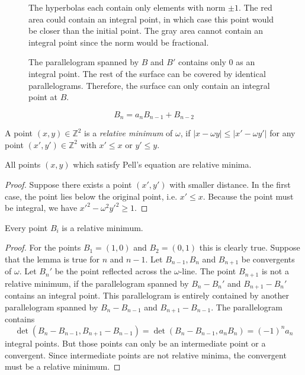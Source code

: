\begin{figure}[b]
  \centering
  
  \caption{
    The hyperbolas each contain only elements with norm $±1$.
    The red area could contain an integral point, in which case this point
    would be closer than the initial point.
    The gray area cannot contain an integral point since the norm would be fractional.}
\end{figure}

\begin{figure}[b]
  \centering
  
  \caption{
    The parallelogram spanned by $B$ and $B'$ contains only $0$ as an integral point.
    The rest of the surface can be covered by identical parallelograms.
    Therefore, the surface can only contain an integral point at $B$.
  }
\end{figure}

\[
  B_n = a_n B_{n-1} + B_{n-2}
\]

\begin{definition}
  A point $(x, y) ∈ ℤ^2$ is a \emph{relative minimum} of $ω$,
  if $|x - ω y| ≤ |x' - ω y'|$ for any point $(x', y') ∈ ℤ^2$ with $x' ≤ x$ or $y' ≤ y$.
\end{definition}

\begin{theorem}
  All points $(x, y)$ which satisfy Pell's equation are relative minima.
\end{theorem}

\begin{proof}
  Suppose there exists a point $(x', y')$ with smaller distance.
  In the first case, the point lies below the original point, i.e. $x' ≤ x$.
  Because the point must be integral, we have $x'^2 - ω^2 y'^2 ≥ 1$.
\end{proof}

\begin{theorem}
  Every point $B_i$ is a relative minimum.
\end{theorem}

\begin{proof}
  For the points $B_1 = (1, 0)$ and $B_2 = (0, 1)$ this is clearly true.
  Suppose that the lemma is true for $n$ and $n - 1$.
  Let $B_{n-1}, B_n$ and $B_{n+1}$ be convergents of $ω$.
  Let $B_n'$ be the point reflected across the $ω$-line.
  The point $B_{n+1}$ is not a relative minimum,
  if the parallelogram spanned by $B_n - B_n'$ and $B_{n+1} - B_n'$ contains an integral point.
  This parallelogram is entirely contained by another parallelogram spanned by
  $B_n - B_{n-1}$ and $B_{n+1} - B_{n-1}$.
  The parallelogram contains
  \[
    \det(B_n - B_{n-1}, B_{n+1} - B_{n-1})
    = \det(B_n - B_{n-1}, a_n B_n)
    = (-1)^n a_n
  \]
  integral points.
  But those points can only be an intermediate point or a convergent.
  Since intermediate points are not relative minima,
  the convergent must be a relative minimum.
\end{proof}

